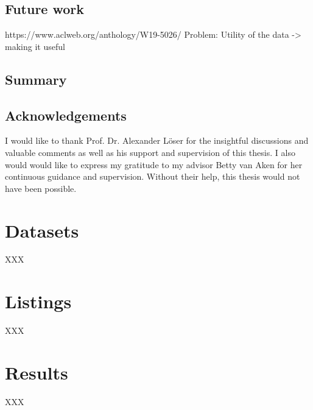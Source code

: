 \documentclass[11pt, a4paper]{book}
\begin{document}
\section{Future work}
https://www.aclweb.org/anthology/W19-5026/
Problem: Utility of the data -> making it useful

\section{Summary}

\newpage

\section*{Acknowledgements}
I would like to thank Prof. Dr. Alexander Löser for the insightful discussions and valuable comments as well as his support and supervision of this thesis. I also would would like to express my gratitude to my advisor Betty van Aken for her continuous guidance and supervision. Without their help, this thesis would not have been possible.


\appendix
\renewcommand\chaptername{Appendix}

\chapter{Datasets}
XXX

\chapter{Listings}
XXX

\chapter{Results} 
XXX
\end{document}
